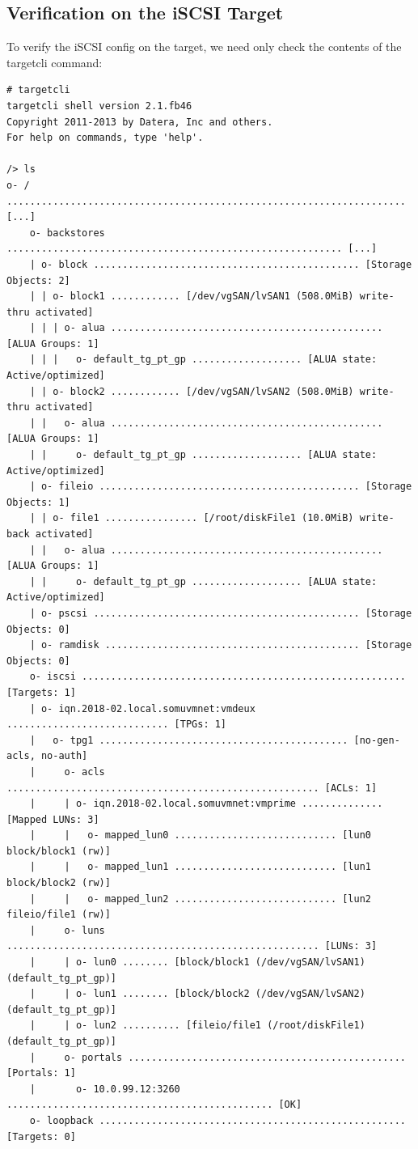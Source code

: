 \subsection{Verification on the iSCSI Target}	
To verify the iSCSI config on the target, we need only check the contents of the targetcli command:

\vspace{-15pt}
\begin{verbatim}
# targetcli
targetcli shell version 2.1.fb46
Copyright 2011-2013 by Datera, Inc and others.
For help on commands, type 'help'.

/> ls
o- / ..................................................................... [...]
	o- backstores .......................................................... [...]
	| o- block .............................................. [Storage Objects: 2]
	| | o- block1 ............ [/dev/vgSAN/lvSAN1 (508.0MiB) write-thru activated]
	| | | o- alua ............................................... [ALUA Groups: 1]
	| | |   o- default_tg_pt_gp ................... [ALUA state: Active/optimized]
	| | o- block2 ............ [/dev/vgSAN/lvSAN2 (508.0MiB) write-thru activated]
	| |   o- alua ............................................... [ALUA Groups: 1]
	| |     o- default_tg_pt_gp ................... [ALUA state: Active/optimized]
	| o- fileio ............................................. [Storage Objects: 1]
	| | o- file1 ................ [/root/diskFile1 (10.0MiB) write-back activated]
	| |   o- alua ............................................... [ALUA Groups: 1]
	| |     o- default_tg_pt_gp ................... [ALUA state: Active/optimized]
	| o- pscsi .............................................. [Storage Objects: 0]
	| o- ramdisk ............................................ [Storage Objects: 0]
	o- iscsi ........................................................ [Targets: 1]
	| o- iqn.2018-02.local.somuvmnet:vmdeux ............................ [TPGs: 1]
	|   o- tpg1 ........................................... [no-gen-acls, no-auth]
	|     o- acls ...................................................... [ACLs: 1]
	|     | o- iqn.2018-02.local.somuvmnet:vmprime .............. [Mapped LUNs: 3]
	|     |   o- mapped_lun0 ............................ [lun0 block/block1 (rw)]
	|     |   o- mapped_lun1 ............................ [lun1 block/block2 (rw)]
	|     |   o- mapped_lun2 ............................ [lun2 fileio/file1 (rw)]
	|     o- luns ...................................................... [LUNs: 3]
	|     | o- lun0 ........ [block/block1 (/dev/vgSAN/lvSAN1) (default_tg_pt_gp)]
	|     | o- lun1 ........ [block/block2 (/dev/vgSAN/lvSAN2) (default_tg_pt_gp)]
	|     | o- lun2 .......... [fileio/file1 (/root/diskFile1) (default_tg_pt_gp)]
	|     o- portals ................................................ [Portals: 1]
	|       o- 10.0.99.12:3260 .............................................. [OK]
	o- loopback ..................................................... [Targets: 0]
\end{verbatim}
\vspace{-10pt}	